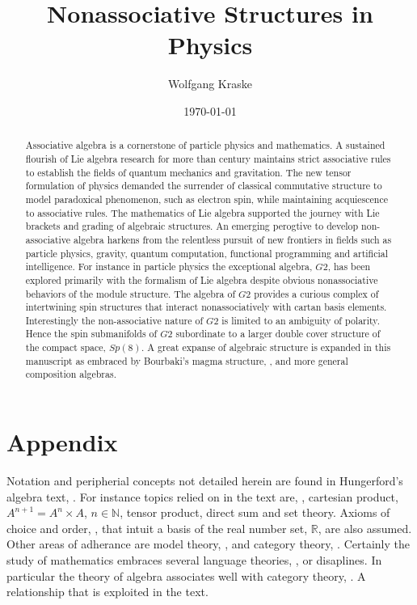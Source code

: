 \documentclass[aps,twocolumn,secnumarabic,nobalancelastpage,amsmath,amssymb,
amsthm,nofootinbib,parskip=full]{revtex4}
\begin{document}
\title{Nonassociative Structures in Physics}
\author         {Wolfgang Kraske}
\date{\today}

\begin{abstract}
Associative algebra is a cornerstone of particle
physics and mathematics. A sustained flourish of
Lie algebra research for more than century maintains
strict associative rules to establish the fields of
quantum mechanics and gravitation. The new
tensor formulation of physics demanded the surrender of
classical commutative structure to model
paradoxical phenomenon, such as electron spin,
while maintaining acquiescence to associative rules.
The mathematics of Lie algebra supported the journey
with Lie brackets and grading of algebraic structures.
An emerging perogtive to develop non-associative algebra 
harkens from the relentless pursuit of new frontiers in
fields such as particle physics, gravity, quantum computation,
functional programming and artificial intelligence.
For instance in particle physics the exceptional algebra, $G2$,
has been explored primarily with the formalism of Lie algebra
despite obvious nonassociative behaviors of the module
structure. The algebra of $G2$ provides a curious
complex of intertwining spin structures that interact
nonassociatively with cartan basis elements. Interestingly
the non-associative nature of $G2$ is limited to an ambiguity
of polarity. Hence the spin submanifolds of $G2$ subordinate to a
larger double cover structure of the compact space, $Sp(8)$.
A great expanse of algebraic structure is expanded in
this manuscript as embraced by
Bourbaki's magma structure, \cite{bourbaki1989}, and
more general composition algebras.
\end{abstract}

\maketitle

\setlength{\parindent}{0em}
\setlength{\parskip}{0.5em}
\renewcommand{\baselinestretch}{1.0}


\section{Appendix}

Notation and peripherial concepts not detailed herein are
found in Hungerford's algebra text, \cite{hungerford1974}.
For instance topics relied on in the text are,
\cite{hungerford1974}, cartesian product,
$A^{n+1}=A^n\times A$, $n\in\mathbb{N}$, tensor product,
direct sum and set theory.
Axioms of choice and order, \cite{hungerford1974},
that intuit a basis of the real number set,
$\mathbb{R}$, are also assumed. Other areas
of adherance are model theory, \cite{hodges1993},
and category theory, \cite{awodey2010}.
Certainly the study of mathematics embraces several
language theories, \cite{hodges1993},
or disaplines. In particular
the theory of algebra associates well with
category theory, \cite{awodey2010}. A relationship that
is exploited in the text.
\end{document}
